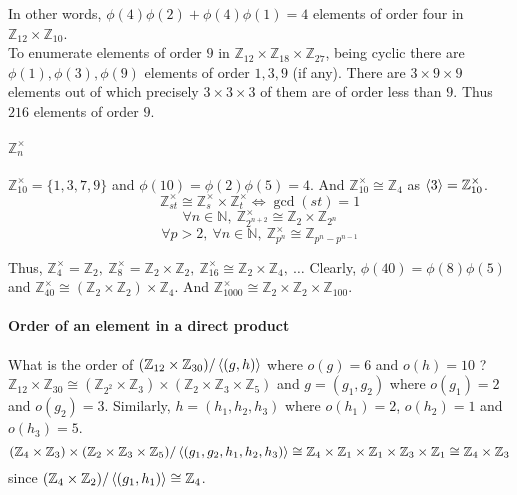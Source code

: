 	In other words, $\phi(4)\phi(2)+\phi(4)\phi(1)=4$ elements of order four in $\mathbb{Z}_{12} \times \mathbb{Z}_{10}$.\\

	To enumerate elements of order $9$ in $\mathbb{Z}_{12} \times \mathbb{Z}_{18} \times \mathbb{Z}_{27}$, being cyclic there are $\phi(1),\phi(3),\phi(9)$ elements of order $1,3,9$ (if any). There are $3 \times 9 \times 9$ elements out of which precisely $3 \times 3 \times 3$ of them are of order less than $9$. Thus $216$ elements of order $9$.

\paragraph{$\mathbb{Z}_n^\times$}
	$\mathbb{Z}_{10}^\times=\{1,3,7,9\}$ and $\phi(10)=\phi(2)\phi(5)=4$.
		And $\mathbb{Z}_{10}^\times \cong \mathbb{Z}_4$ as $\left\langle 3 \right\rangle = \mathbb{Z}_{10}^\times$.
		$$\mathbb{Z}_{st}^\times \cong \mathbb{Z}_s^\times \times \mathbb{Z}_t^\times \iff \gcd(st) = 1$$
		$$\forall n \in \mathbb{N},\ \mathbb{Z}_{2^{n+2}}^\times \cong \mathbb{Z}_2 \times \mathbb{Z}_{2^n}$$
		$$\forall p > 2,\ \forall n \in \mathbb{N},\ \mathbb{Z}_{p^n}^\times \cong \mathbb{Z}_{p^n-p^{n-1}}$$

		Thus, $\mathbb{Z}_4^\times = \mathbb{Z}_2,\ \mathbb{Z}_8^\times = \mathbb{Z}_2 \times \mathbb{Z}_2,\ \mathbb{Z}_{16}^\times \cong \mathbb{Z}_2 \times \mathbb{Z}_4,\ \dots$
		Clearly, $\phi(40) = \phi(8)\phi(5)$ and $\mathbb{Z}_{40}^\times \cong (\mathbb{Z}_2 \times \mathbb{Z}_2) \times \mathbb{Z}_4$.
		And $\mathbb{Z}_{1000}^\times \cong \mathbb{Z}_2 \times \mathbb{Z}_2 \times \mathbb{Z}_{100}$.

\paragraph{Order of an element in a direct product}
	What is the order of $(\mathbb{Z}_{12} \times \mathbb{Z}_{30})/\left\langle (g,h) \right\rangle$ where $o(g) = 6$ and $o(h)=10$ ?\\
		$\mathbb{Z}_{12} \times \mathbb{Z}_{30} \cong (\mathbb{Z}_{2^2} \times \mathbb{Z}_3) \times (\mathbb{Z}_2 \times \mathbb{Z}_3 \times \mathbb{Z}_5)$ and $g = (g_1,g_2)$ where $o(g_1) = 2$ and $o(g_2)=3$. Similarly, $h = (h_1,h_2,h_3)$ where $o(h_1)=2$, $o(h_2)=1$ and $o(h_3) = 5$.
		$$ (\mathbb{Z}_4 \times \mathbb{Z}_3) \times (\mathbb{Z}_2 \times \mathbb{Z}_3 \times \mathbb{Z}_5)/\left\langle (g_1,g_2,h_1,h_2,h_3) \right\rangle \cong \mathbb{Z}_4 \times \mathbb{Z}_1 \times \mathbb{Z}_1 \times \mathbb{Z}_3 \times \mathbb{Z}_1 \cong \mathbb{Z}_4 \times \mathbb{Z}_3$$
		since $(\mathbb{Z}_4 \times \mathbb{Z}_2) /\left\langle (g_1,h_1) \right\rangle \cong \mathbb{Z}_4$.

